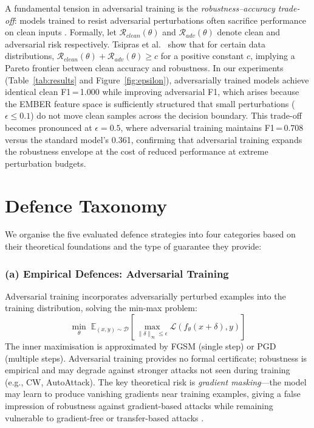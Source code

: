 \documentclass[conference]{IEEEtran}
\begin{document}
A fundamental tension in adversarial training is the \emph{robustness--accuracy trade-off}: models trained to resist adversarial perturbations often sacrifice performance on clean inputs \cite{tsipras2019}. Formally, let $\mathcal{R}_{clean}(\theta)$ and $\mathcal{R}_{adv}(\theta)$ denote clean and adversarial risk respectively. Tsipras et al.\ \cite{tsipras2019} show that for certain data distributions, $\mathcal{R}_{clean}(\theta) + \mathcal{R}_{adv}(\theta) \geq c$ for a positive constant $c$, implying a Pareto frontier between clean accuracy and robustness. In our experiments (Table~\ref{tab:results} and Figure~\ref{fig:epsilon}), adversarially trained models achieve identical clean F1\,=\,1.000 while improving adversarial F1, which arises because the EMBER feature space is sufficiently structured that small perturbations ($\epsilon \leq 0.1$) do not move clean samples across the decision boundary. This trade-off becomes pronounced at $\epsilon = 0.5$, where adversarial training maintains F1\,=\,0.708 versus the standard model's 0.361, confirming that adversarial training expands the robustness envelope at the cost of reduced performance at extreme perturbation budgets.

\section{Defence Taxonomy}
\label{sec:taxonomy}

We organise the five evaluated defence strategies into four categories based on their theoretical foundations and the type of guarantee they provide:

\subsubsection{(a) Empirical Defences: Adversarial Training}

Adversarial training \cite{madry2018,goodfellow2015} incorporates adversarially perturbed examples into the training distribution, solving the min-max problem:
\begin{equation}
\min_\theta\; \mathbb{E}_{(x,y)\sim\mathcal{D}}\!\left[\max_{\|\delta\|_\infty \leq \epsilon}\mathcal{L}(f_\theta(x+\delta), y)\right]
\label{eq:at_minmax}
\end{equation}
The inner maximisation is approximated by FGSM (single step) or PGD (multiple steps). Adversarial training provides no formal certificate; robustness is empirical and may degrade against stronger attacks not seen during training (e.g., CW, AutoAttack). The key theoretical risk is \emph{gradient masking}---the model may learn to produce vanishing gradients near training examples, giving a false impression of robustness against gradient-based attacks while remaining vulnerable to gradient-free or transfer-based attacks \cite{athalye2018}.
\end{document}
